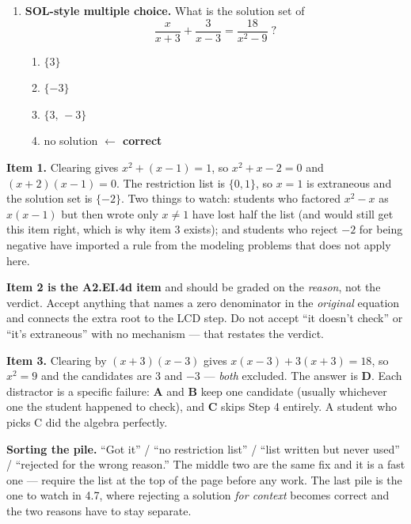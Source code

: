 \documentclass[10pt]{article}
\begin{document}
\begin{enumerate}[leftmargin=1.8em, itemsep=9pt]
  \item \textbf{SOL-style multiple choice.} What is the solution set of
        \[ \frac{x}{x+3}+\frac{3}{x-3}=\frac{18}{x^2-9}\;? \]
        \vspace{-8pt}
        \begin{enumerate}[label=\Alph*., leftmargin=1.9em, itemsep=1pt]
          \item $\{3\}$
          \item $\{-3\}$
          \item $\{3,\,-3\}$
          \item no solution \quad \textcolor{keyred}{\textbf{$\leftarrow$ correct}}
        \end{enumerate}
\end{enumerate}

\begin{teachernote}
\textbf{Item 1.} Clearing gives $x^2+(x-1)=1$, so $x^2+x-2=0$ and $(x+2)(x-1)=0$. The restriction list
is $\{0,1\}$, so $x=1$ is extraneous and the solution set is $\{-2\}$. Two things to watch: students who
factored $x^2-x$ as $x(x-1)$ but then wrote only $x\neq1$ have lost half the list (and would still get
this item right, which is why item 3 exists); and students who reject $-2$ for being negative have
imported a rule from the modeling problems that does not apply here.

\vspace{3pt}
\textbf{Item 2 is the A2.EI.4d item} and should be graded on the \emph{reason}, not the verdict.
Accept anything that names a zero denominator in the \emph{original} equation and connects the extra
root to the LCD step. Do not accept ``it doesn't check'' or ``it's extraneous'' with no mechanism ---
that restates the verdict.

\vspace{3pt}
\textbf{Item 3.} Clearing by $(x+3)(x-3)$ gives $x(x-3)+3(x+3)=18$, so $x^2=9$ and the candidates are
$3$ and $-3$ --- \emph{both} excluded. The answer is \textbf{D}. Each distractor is a specific failure:
\textbf{A} and \textbf{B} keep one candidate (usually whichever one the student happened to check),
and \textbf{C} skips Step 4 entirely. A student who picks C did the algebra perfectly.

\vspace{3pt}
\textbf{Sorting the pile.} ``Got it'' / ``no restriction list'' / ``list written but never used'' /
``rejected for the wrong reason.'' The middle two are the same fix and it is a fast one --- require the
list at the top of the page before any work. The last pile is the one to watch in 4.7, where rejecting
a solution \emph{for context} becomes correct and the two reasons have to stay separate.
\end{teachernote}
\end{document}

